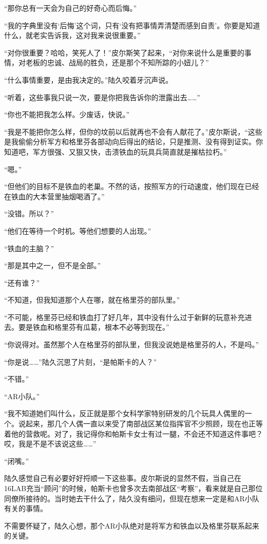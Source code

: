 “那你总有一天会为自己的好奇心而后悔。”

“我的字典里没有‘后悔’这个词，只有‘没有把事情弄清楚而感到自责’。你要是知道什么，就老实告诉我，这对我来说很重要。”

“对你很重要？哈哈，笑死人了！”皮尔斯笑了起来，“对你来说什么是重要的事情，对老板的忠诚、战局的胜负，还是那个不知所踪的小妞儿？”

“什么事情重要，是由我决定的。”陆久咬着牙沉声说。

“听着，这些事我只说一次，要是你把我告诉你的泄露出去……”

“你也不能把我怎么样。少废话，快说。”

“我是不能把你怎么样，但你的坟前以后就再也不会有人献花了。”皮尔斯说，“这些是我偷偷分析军方和格里芬各部动向后得出的结论，只是推测、没有得到证实。你知道吧，军方很强、又狠又快，击溃铁血的玩具兵简直就是摧枯拉朽。”

“嗯。”

“但他们的目标不是铁血的老巢。不然的话，按照军方的行动速度，他们现在已经在铁血的大本营里抽烟喝酒了。”

“没错。所以？”

“他们在等待一个时机。等他们想要的人出现。”

“铁血的主脑？”

“那是其中之一，但不是全部。”

“还有谁？”

“不知道，但我知道那个人在哪，就在格里芬的部队里。”

“不可能，格里芬已经和铁血打了好几年，其中没有什么过于新鲜的玩意补充进去。要是铁血和格里芬有瓜葛，根本不必等到现在。”

“你说得对。虽然那个人在格里芬的部队里，但我没说她是格里芬的人，不是吗。”

“你是说……”陆久沉思了片刻，“是帕斯卡的人？”

“不错。”

“AR小队。”

“我不知道她们叫什么，反正就是那个女科学家特别研发的几个玩具人偶里的一个。说起来，那几个人偶一直以来受了南部战区某位指挥官不少照顾，现在也正等着他的营救呢。对了，我记得你和帕斯卡女士有过一腿，不会还不知道这件事吧？哎，我是不是不该说这些……”

“闭嘴。”

陆久感觉自己有必要好好捋顺一下这些事。皮尔斯说的显然不假，当自己在16LAB充当“顾问”的时候，帕斯卡也曾多次去南部战区“考察”，看来就是自己那位同僚所接待的。当时她去干什么了，陆久没有细问，但现在想来一定是和AR小队有关的事情。

不需要怀疑了，陆久心想，那个AR小队绝对是将军方和铁血以及格里芬联系起来的关键。

